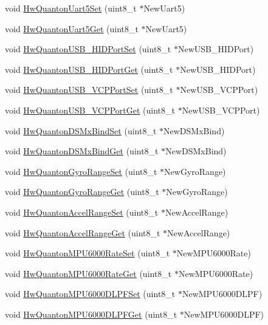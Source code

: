 \begin{DoxyCompactItemize}
void \hyperlink{group___hw_quanton_ga88930b37bf423d4c75ac22ea62fe035b}{\-Hw\-Quanton\-Uart5\-Set} (uint8\-\_\-t $\ast$\-New\-Uart5)
\item 
void \hyperlink{group___hw_quanton_ga17c3e51d81b06077dae750ee00b31f77}{\-Hw\-Quanton\-Uart5\-Get} (uint8\-\_\-t $\ast$\-New\-Uart5)
\item 
void \hyperlink{group___hw_quanton_ga7059a50f5ddcccdaa4ef03ce2633c87b}{\-Hw\-Quanton\-U\-S\-B\-\_\-\-H\-I\-D\-Port\-Set} (uint8\-\_\-t $\ast$\-New\-U\-S\-B\-\_\-\-H\-I\-D\-Port)
\item 
void \hyperlink{group___hw_quanton_ga7c6982854d1057728fdbfbd21ec75ca2}{\-Hw\-Quanton\-U\-S\-B\-\_\-\-H\-I\-D\-Port\-Get} (uint8\-\_\-t $\ast$\-New\-U\-S\-B\-\_\-\-H\-I\-D\-Port)
\item 
void \hyperlink{group___hw_quanton_ga06eb35c5cfaa741a182925b66fb8752e}{\-Hw\-Quanton\-U\-S\-B\-\_\-\-V\-C\-P\-Port\-Set} (uint8\-\_\-t $\ast$\-New\-U\-S\-B\-\_\-\-V\-C\-P\-Port)
\item 
void \hyperlink{group___hw_quanton_ga8ed56adbe84336912f9bf119eb0b90b2}{\-Hw\-Quanton\-U\-S\-B\-\_\-\-V\-C\-P\-Port\-Get} (uint8\-\_\-t $\ast$\-New\-U\-S\-B\-\_\-\-V\-C\-P\-Port)
\item 
void \hyperlink{group___hw_quanton_ga0c28ffbc56f6a5ae0bfa1b9e5e649884}{\-Hw\-Quanton\-D\-S\-Mx\-Bind\-Set} (uint8\-\_\-t $\ast$\-New\-D\-S\-Mx\-Bind)
\item 
void \hyperlink{group___hw_quanton_ga837a5563e3cd4acb72e3a86dbe4e295f}{\-Hw\-Quanton\-D\-S\-Mx\-Bind\-Get} (uint8\-\_\-t $\ast$\-New\-D\-S\-Mx\-Bind)
\item 
void \hyperlink{group___hw_quanton_ga9a4dcb548858226e38526fb1a70d78a9}{\-Hw\-Quanton\-Gyro\-Range\-Set} (uint8\-\_\-t $\ast$\-New\-Gyro\-Range)
\item 
void \hyperlink{group___hw_quanton_ga6894ea1675e62ca8ce52bab38df98f2e}{\-Hw\-Quanton\-Gyro\-Range\-Get} (uint8\-\_\-t $\ast$\-New\-Gyro\-Range)
\item 
void \hyperlink{group___hw_quanton_gaa6bc3d1b27fd2467b25a40479fd32e55}{\-Hw\-Quanton\-Accel\-Range\-Set} (uint8\-\_\-t $\ast$\-New\-Accel\-Range)
\item 
void \hyperlink{group___hw_quanton_ga6701424b9de1b2e85ea1d5fed772563c}{\-Hw\-Quanton\-Accel\-Range\-Get} (uint8\-\_\-t $\ast$\-New\-Accel\-Range)
\item 
void \hyperlink{group___hw_quanton_gafce2e1b9e114bd890fddbaeba04a4057}{\-Hw\-Quanton\-M\-P\-U6000\-Rate\-Set} (uint8\-\_\-t $\ast$\-New\-M\-P\-U6000\-Rate)
\item 
void \hyperlink{group___hw_quanton_gac86c2136179d05bc14164f9be3322762}{\-Hw\-Quanton\-M\-P\-U6000\-Rate\-Get} (uint8\-\_\-t $\ast$\-New\-M\-P\-U6000\-Rate)
\item 
void \hyperlink{group___hw_quanton_ga728b182f261c465619e8237c18641769}{\-Hw\-Quanton\-M\-P\-U6000\-D\-L\-P\-F\-Set} (uint8\-\_\-t $\ast$\-New\-M\-P\-U6000\-D\-L\-P\-F)
\item 
void \hyperlink{group___hw_quanton_ga31609bff9e6ebc06e7a098a26672d1ba}{\-Hw\-Quanton\-M\-P\-U6000\-D\-L\-P\-F\-Get} (uint8\-\_\-t $\ast$\-New\-M\-P\-U6000\-D\-L\-P\-F)
\end{DoxyCompactItemize}


